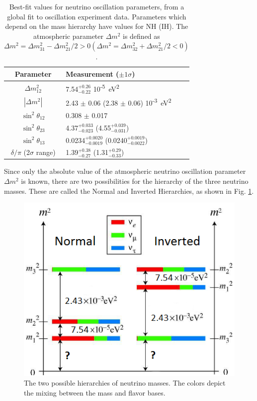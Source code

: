 \begin{table}[!htbp]
\caption{Best-fit values for neutrino oscillation parameters, from a global fit to oscillation experiment data.   Parameters which depend on the mass hierarchy have values for NH (IH).  The atmospheric parameter $\Delta m^{2}$ is defined as $\Delta m^{2} = \Delta m_{31}^{2} - \Delta m_{21}^{2}/2 > 0 (\Delta m^{2} = \Delta m_{32}^{2} + \Delta m_{21}^{2}/2 < 0)$. \cite{ReviewNuMass}} %
\label{table:nu_osc_vals}
\begin{tabular}{c|l}
Parameter & Measurement ($\pm 1 \sigma$) \\
\hline
$\Delta m_{12}^{2}$ & 7.54$^{+0.26}_{-0.22}$ 10\textsuperscript{-5}~eV\textsuperscript{2}\\
$|\Delta m^{2}|$ & 2.43 $\pm$ 0.06 (2.38 $\pm$ 0.06) 10\textsuperscript{-3}~eV\textsuperscript{2}\\
$\sin^{2} \theta_{12}$ & 0.308 $\pm$ 0.017\\
$\sin^{2} \theta_{23}$ & 4.37$^{+0.033}_{-0.023}$ (4.55$^{+0.039}_{-0.031}$)\\
$\sin^{2} \theta_{13}$ & 0.0234$^{+0.0020}_{-0.0019}$ (0.0240$^{+0.0019}_{-0.0022}$)\\
$\delta / \pi$ (2$\sigma$ range)& 1.39$^{+0.38}_{-0.27}$ (1.31$^{+0.29}_{-0.33}$)\\
\end{tabular}
\end{table}

Since only the absolute value of the atmospheric neutrino oscillation parameter $\Delta m^{2}$ is known, there are two possibilities for the hierarchy of the three neutrino masses.  These are called the Normal and Inverted Hierarchies, as shown in Fig. \ref{fig:numasshier}.

\begin{figure} %
        \centering
                \includegraphics[width=.5\textwidth]{figures/hierarchy_alterred.png}
                \caption{The two possible hierarchies of neutrino masses.  The colors depict the mixing between the mass and flavor bases.}
\label{fig:numasshier}
\end{figure}


